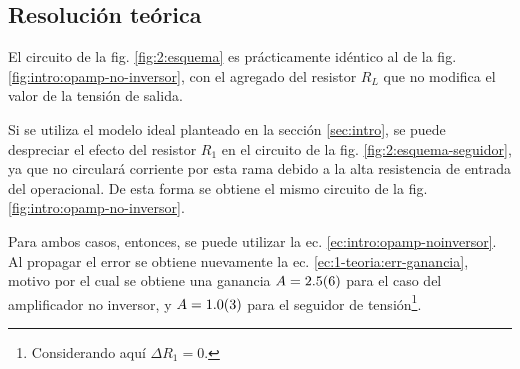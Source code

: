 \subsection{Resolución teórica}

El circuito de la fig. \ref{fig:2:esquema} es prácticamente idéntico al de
la fig. \ref{fig:intro:opamp-no-inversor}, con el agregado del resistor $R_L$
que no modifica el valor de la tensión de salida.

Si se utiliza el modelo ideal planteado en la sección
\ref{sec:intro}, se puede despreciar el efecto del resistor
$R_1$ en el circuito de la fig. \ref{fig:2:esquema-seguidor}, ya que no
circulará corriente por esta rama debido a la alta resistencia de entrada del
operacional. De esta forma se obtiene el mismo circuito de la fig.
\ref{fig:intro:opamp-no-inversor}.

Para ambos casos, entonces, se puede utilizar la ec.
\ref{ec:intro:opamp-noinversor}. Al propagar el error se obtiene nuevamente
la ec. \ref{ec:1-teoria:err-ganancia}, motivo por el cual se obtiene una 
ganancia $A = \num{2.5 \pm 0.6}$ para el caso del amplificador no inversor,
y $A = \num{1.0 \pm 0.3}$ para el seguidor de
tensión\footnote{Considerando aquí $\Delta R_1 = 0$.}.
